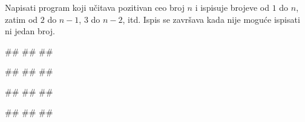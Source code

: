 \begin{Exercise}[difficulty=1, label=PET_61] 
Napisati program koji učitava pozitivan ceo broj $n$ i ispisuje
brojeve od $1$ do $n$, zatim od $2$ do $n-1$, $3$ do $n-2$, itd. Ispis
se završava kada nije moguće ispisati ni jedan broj.

\begin{miditest}
\begin{upotreba}{1}
#\naslovInt#
##
##
\end{upotreba}
\end{miditest}
\begin{miditest}
\begin{upotreba}{2}
#\naslovInt#
##
##
\end{upotreba}
\end{miditest}

\begin{miditest}
\begin{upotreba}{3}
#\naslovInt#
##
##
\end{upotreba}
\end{miditest}
\begin{miditest}
\begin{upotreba}{4}
#\naslovInt#
##
##
\end{upotreba}
\end{miditest}
\end{Exercise}
\ifresenja
\begin{Answer}[ref=PET_61]
\end{Answer}
\fi


